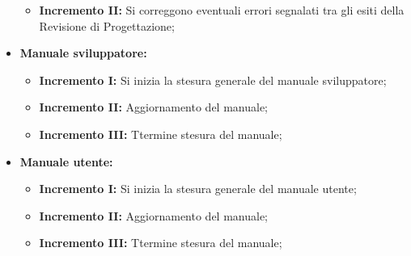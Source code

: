\documentclass[../piano_di_progetto.tex]{subfiles}
\begin{document}
\begin{itemize}
\begin{itemize}
            \item \textbf{Incremento II:} Si correggono eventuali errori segnalati tra gli esiti della Revisione di Progettazione;
        \end{itemize}
        \item \textbf{Manuale sviluppatore:}
        \begin{itemize}
            \item \textbf{Incremento I:} Si inizia la stesura generale del manuale sviluppatore;
            \item \textbf{Incremento II:} Aggiornamento del manuale;
            \item \textbf{Incremento III:} Ttermine stesura del manuale;
        \end{itemize}
        \item \textbf{Manuale utente:}
        \begin{itemize}
            \item \textbf{Incremento I:} Si inizia la stesura generale del manuale utente;
            \item \textbf{Incremento II:} Aggiornamento del manuale;
            \item \textbf{Incremento III:} Ttermine stesura del manuale;
        \end{itemize}
\end{itemize}
\end{document}
